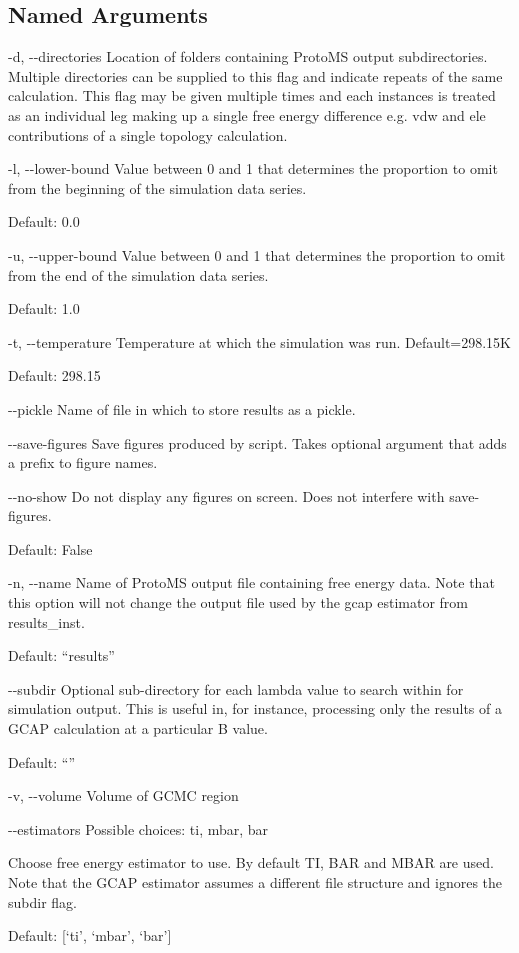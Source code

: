 \documentclass[letterpaper,10pt,english]{sphinxmanual}
\begin{document}
\subsection{Named Arguments}
\label{\detokenize{tools:Named Arguments}}\begin{optionlist}{3cm}
\item [-d, -{-}directories]  
Location of folders containing ProtoMS output subdirectories. Multiple directories can be supplied to this flag and indicate repeats of the same calculation. This flag may be given multiple times and each instances is treated as an individual leg making up a single free energy difference e.g. vdw and ele contributions of a single topology calculation.
\item [-l, -{-}lower-bound]  
Value between 0 and 1 that determines the proportion to omit from the beginning of the simulation data series.

Default: 0.0
\item [-u, -{-}upper-bound]  
Value between 0 and 1 that determines the proportion to omit from the end of the simulation data series.

Default: 1.0
\item [-t, -{-}temperature]  
Temperature at which the simulation was run. Default=298.15K

Default: 298.15
\item [-{-}pickle]  
Name of file in which to store results as a pickle.
\item [-{-}save-figures]  
Save figures produced by script. Takes optional argument that adds a prefix to figure names.
\item [-{-}no-show]  
Do not display any figures on screen. Does not interfere with \textendash{}save-figures.

Default: False
\item [-n, -{-}name]  
Name of ProtoMS output file containing free energy data. Note that this option will not change the output file used by the gcap estimator from results\_inst.

Default: “results”
\item [-{-}subdir]  
Optional sub-directory for each lambda value to search within for simulation output. This is useful in, for instance, processing only the results of a GCAP calculation at a particular B value.

Default: “”
\item [-v, -{-}volume]  
Volume of GCMC region
\item [-{-}estimators]  
Possible choices: ti, mbar, bar

Choose free energy estimator to use. By default TI, BAR and MBAR are used. Note that the GCAP estimator assumes a different file structure and ignores the \textendash{}subdir flag.

Default: {[}‘ti’, ‘mbar’, ‘bar’{]}
\end{optionlist}
\end{document}
